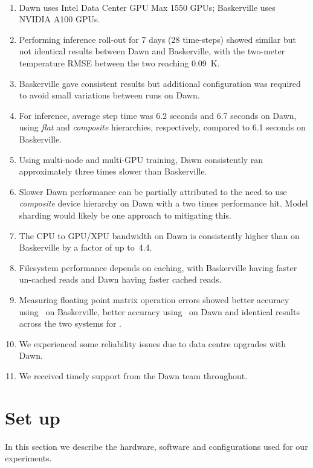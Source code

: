 \begin{enumerate}
    \item Dawn uses Intel\textsuperscript{\tiny\textregistered} Data Center GPU Max 1550 GPUs; Baskerville uses NVIDIA A100 GPUs.
    \item Performing inference roll-out for 7 days (28 time-steps) showed similar but not identical results between Dawn and Baskerville, with the two-meter temperature RMSE between the two reaching \qty{0.09}{\kelvin}.
    \item Baskerville gave consistent results but additional configuration was required to avoid small variations between runs on Dawn.
    \item For inference, average step time was 6.2 seconds and 6.7 seconds on Dawn, using \textit{flat} and \textit{composite} hierarchies, respectively, compared to 6.1 seconds on Baskerville.
    \item Using multi-node and multi-GPU training, Dawn consistently ran approximately three times slower than Baskerville.
    \item Slower Dawn performance can be partially attributed to the need to use \textit{composite} device hierarchy on Dawn with a two times performance hit. Model sharding would likely be one approach to mitigating this.
    \item The CPU to GPU/XPU bandwidth on Dawn is consistently higher
      than on Baskerville by a factor of up to~4.4.
    \item Filesystem performance depends on caching, with Baskerville having faster un-cached reads and Dawn having faster cached reads.
    \item Measuring floating point matrix operation errors showed better accuracy using \fpsingle\ on Baskerville, better accuracy using \fphalf\ on Dawn and identical results across the two systems for \bfhalf.
    \item We experienced some reliability issues due to data centre upgrades with Dawn.
    \item We received timely support from the Dawn team throughout.
\end{enumerate}

\section{Set up}

In this section we describe the hardware, software and configurations used for our experiments.

